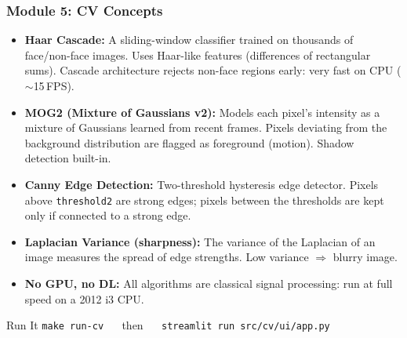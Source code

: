 \begin{frame}[fragile]\frametitle{Module 5: CV Concepts}
\begin{itemize}
  \item \textbf{Haar Cascade:} A sliding-window classifier trained on thousands of face/non-face images. Uses Haar-like features (differences of rectangular sums). Cascade architecture rejects non-face regions early: very fast on CPU ($\sim$15\,FPS).
  \item \textbf{MOG2 (Mixture of Gaussians v2):} Models each pixel's intensity as a mixture of Gaussians learned from recent frames. Pixels deviating from the background distribution are flagged as foreground (motion). Shadow detection built-in.
  \item \textbf{Canny Edge Detection:} Two-threshold hysteresis edge detector. Pixels above \texttt{threshold2} are strong edges; pixels between the thresholds are kept only if connected to a strong edge.
  \item \textbf{Laplacian Variance (sharpness):} The variance of the Laplacian of an image measures the spread of edge strengths. Low variance $\Rightarrow$ blurry image.
  \item \textbf{No GPU, no DL:} All algorithms are classical signal processing: run at full speed on a 2012 i3 CPU.
\end{itemize}
\begin{block}{Run It}
  \texttt{make run-cv} $\quad$ then $\quad$ \texttt{streamlit run src/cv/ui/app.py}
\end{block}
\end{frame}

